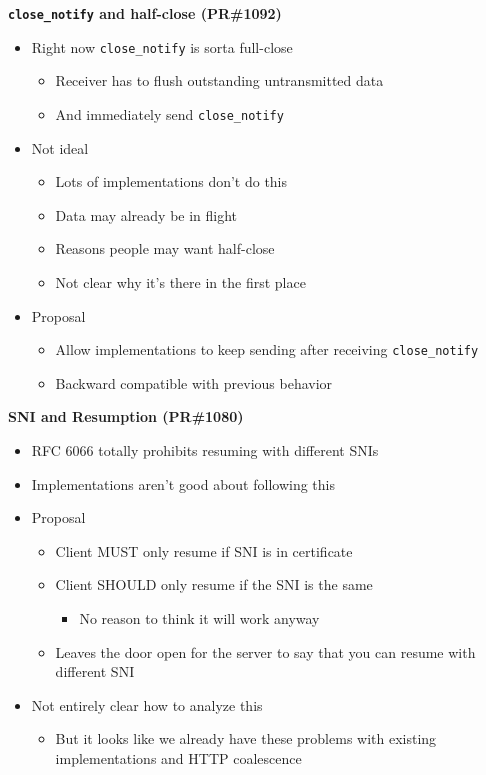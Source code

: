 \documentclass[helvetica]{seminar}
\newcommand{\heading}[1]{%
  \begin{center} 
    \large\bf 
    #1 
  \end{center} 
  \vspace{.4 in}}
\begin{document}
\begin{slide}
\heading{\texttt{close\_notify} and half-close (PR\#1092)}

\begin{itemize}
\item Right now \verb^close_notify^ is sorta full-close
  \begin{itemize}
  \item Receiver has to flush outstanding untransmitted data
  \item And immediately send \verb^close_notify^
  \end{itemize}

\item Not ideal
  \begin{itemize}
  \item Lots of implementations don't do this
  \item Data may already be in flight
  \item Reasons people may want half-close
  \item Not clear why it's there in the first place

  \end{itemize}

\item Proposal
  \begin{itemize}
  \item Allow implementations to keep sending after receiving \verb^close_notify^
  \item Backward compatible with previous behavior
  \end{itemize}
\end{itemize}
\end{slide}


\begin{slide}
  \heading{SNI and Resumption (PR\#1080)}

  \begin{itemize}
  \item RFC 6066 totally prohibits resuming with different SNIs
  \item Implementations aren't good about following this
  \item Proposal
    \begin{itemize}
    \item Client MUST only resume if SNI is in certificate
    \item Client SHOULD only resume if the SNI is the same
      \begin{itemize}
      \item No reason to think it will work anyway
      \end{itemize}
    \item Leaves the door open for the server to say that you can resume with different SNI
    \end{itemize}
  \item Not entirely clear how to analyze this
    \begin{itemize}
    \item But it looks like we already have these problems with existing implementations and HTTP coalescence
    \end{itemize}
  \end{itemize}
\end{slide}
\end{document}
